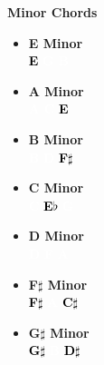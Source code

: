 \documentclass[a4paper,landscape]{article}
\newcommand{\noteBadge}[3]{%
    \colorbox{#1}{\textcolor{#2}{\textbf{#3}}}%
}
\begin{document}
\begin{multicols}{4}
\noindent
\textbf{Minor Chords}
\begin{itemize}
    \item \textbf{E Minor} \\
          \noteBadge{colorE}{black}{E} \quad \noteBadge{colorG}{white}{G} \quad \noteBadge{colorB}{white}{B}
    \item \textbf{A Minor} \\
          \noteBadge{colorA}{white}{A} \quad \noteBadge{colorC}{white}{C} \quad \noteBadge{colorE}{black}{E}
    \item \textbf{B Minor} \\
          \noteBadge{colorB}{white}{B} \quad \noteBadge{colorD}{white}{D} \quad \noteBadge{colorFs}{black}{F$\sharp$}
    \item \textbf{C Minor} \\
          \noteBadge{colorC}{white}{C} \quad \noteBadge{colorDs}{black}{E$\flat$} \quad \noteBadge{colorG}{white}{G}
    \item \textbf{D Minor} \\
          \noteBadge{colorD}{white}{D} \quad \noteBadge{colorF}{white}{F} \quad \noteBadge{colorA}{white}{A}
    \item \textbf{F$\sharp$ Minor} \\
          \noteBadge{colorFs}{black}{F$\sharp$} \quad \noteBadge{colorA}{white}{A} \quad \noteBadge{colorCs}{black}{C$\sharp$}
    \item \textbf{G$\sharp$ Minor} \\
          \noteBadge{colorGs}{black}{G$\sharp$} \quad \noteBadge{colorB}{white}{B} \quad \noteBadge{colorDs}{black}{D$\sharp$}
\end{itemize}

\columnbreak


\end{multicols}
\end{document}

